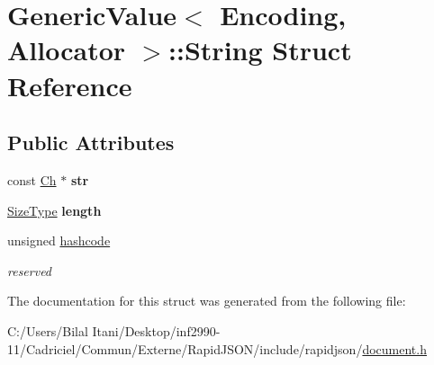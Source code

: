 \hypertarget{struct_generic_value_1_1_string}{}\section{Generic\+Value$<$ Encoding, Allocator $>$\+:\+:String Struct Reference}
\label{struct_generic_value_1_1_string}
\subsection*{Public Attributes}
\begin{DoxyCompactItemize}
\item 
const \hyperlink{class_generic_value_ade0e0ce64ccd5d852da57a35e720bafb}{Ch} $\ast$ {\bfseries str}\hypertarget{struct_generic_value_1_1_string_a4eebc5acf3f93ab833efd82abf3ba84d}{}\label{struct_generic_value_1_1_string_a4eebc5acf3f93ab833efd82abf3ba84d}

\item 
\hyperlink{rapidjson_8h_a5ed6e6e67250fadbd041127e6386dcb5}{Size\+Type} {\bfseries length}\hypertarget{struct_generic_value_1_1_string_ad6ffab0e093aa8db6e415812ff6443bf}{}\label{struct_generic_value_1_1_string_ad6ffab0e093aa8db6e415812ff6443bf}

\item 
unsigned \hyperlink{struct_generic_value_1_1_string_a3f1da673591f850e425184f2d8495d66}{hashcode}\hypertarget{struct_generic_value_1_1_string_a3f1da673591f850e425184f2d8495d66}{}\label{struct_generic_value_1_1_string_a3f1da673591f850e425184f2d8495d66}

\begin{DoxyCompactList}\small\item\em reserved \end{DoxyCompactList}\end{DoxyCompactItemize}


The documentation for this struct was generated from the following file\+:\begin{DoxyCompactItemize}
\item 
C\+:/\+Users/\+Bilal Itani/\+Desktop/inf2990-\/11/\+Cadriciel/\+Commun/\+Externe/\+Rapid\+J\+S\+O\+N/include/rapidjson/\hyperlink{document_8h}{document.\+h}\end{DoxyCompactItemize}
